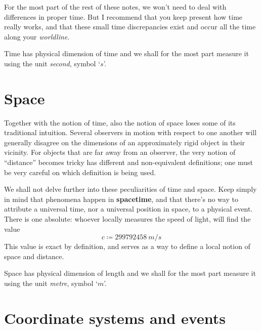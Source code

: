 \documentclass[a4paper,12pt,%
onecolumn,oneside,titlepage,%
british%
]{memoir}
\newcommand*{\defd}{\coloneqq}
\renewcommand*{\|}[1][]{\nonscript\:#1\vert\nonscript\:\mathopen{}}
\begin{document}
For the most part of the rest of these notes, we won't need to deal with differences in proper time. But I recommend that you keep present how time really works, and that these small time discrepancies exist and occur all the time along your \emph{worldline}.

\smallskip

Time has physical dimension of \textsf{time} and we shall for the most part measure it using the unit \emph{second}, symbol \enquote*{$\unit{s}$}.



\section{Space}
\label{sec:space}

Together with the notion of time, also the notion of space loses some of its traditional intuition. Several observers in motion with respect to one another will generally disagree on the dimensions of an approximately rigid object in their vicinity. For objects that are far away from an observer, the very notion of \enquote{distance} becomes tricky has different and non-equivalent definitions; one must be very careful on which definition is being used.

\smallskip

We shall not delve further into these peculiarities of time and space. Keep simply in mind that phenomena happen in \textbf{spacetime}, and that there's no way to attribute a universal time, nor a universal position in space, to a physical event. There is one absolute: whoever locally measures the speed of light, will find the value
\begin{equation}
  \label{eq:c}
  c\defd \qty{299792458}{m/s}
\end{equation}
This value is exact by definition, and serves as a way to define a local notion of space and distance.

\smallskip

Space has physical dimension of \textsf{length} and we shall for the most part measure it using the unit \emph{metre}, symbol \enquote*{$\unit{m}$}.




\section{Coordinate systems and events}
\label{sec:coords}
\end{document}
